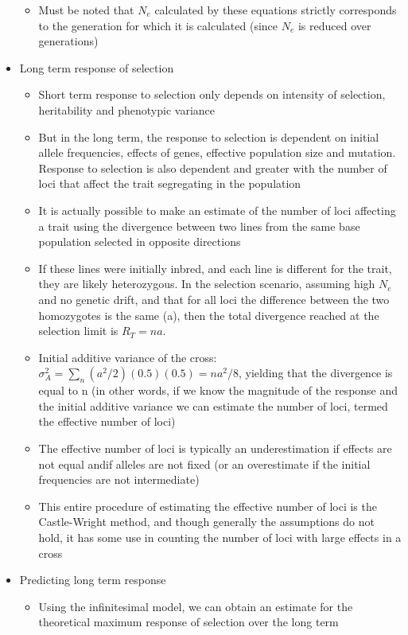\documentclass[12pt]{amsart}
\begin{document}
\begin{itemize}
\begin{itemize}
\item Must be noted that $N_e$ calculated by these equations strictly corresponds to the generation for which it is calculated (since $N_e$ is reduced over generations)
\end{itemize}
\item Long term response of selection
\begin{itemize}
\item Short term response to selection only depends on intensity of selection, heritability and phenotypic variance
\item But in the long term, the response to selection is dependent on initial allele frequencies, effects of genes, effective population size and mutation. Response to selection is also dependent and greater with the number of loci that affect the trait segregating in the population
\item It is actually possible to make an estimate of the number of loci affecting a trait using the divergence between two lines from the same base population selected in opposite directions
\item If these lines were initially inbred, and each line is different for the trait, they are likely heterozygous. In the selection scenario, assuming high $N_e$ and no genetic drift, and that for all loci the difference between the two homozygotes is the same (a), then the total divergence reached at the selection limit is $R_T = na$. 
\item Initial additive variance of the cross: $\sigma_A^2 = \sum_n (a^2/2)(0.5)(0.5) = na^2/8$, yielding that the divergence is equal to n (in other words, if we know the magnitude of the response and the initial additive variance we can estimate the number of loci, termed the effective number of loci)
\item The effective number of loci is typically an underestimation if effects are not equal andif alleles are not fixed (or an overestimate if the initial frequencies are not intermediate)
\item This entire procedure of estimating the effective number of loci is the Castle-Wright method, and though generally the assumptions do not hold, it has some use in counting the number of loci with large effects in a cross 
\end{itemize}
\item Predicting long term response
\begin{itemize}
\item Using the infinitesimal model, we can obtain an estimate for the theoretical maximum response of selection over the long term

\end{itemize}
\end{itemize}
\end{document}
